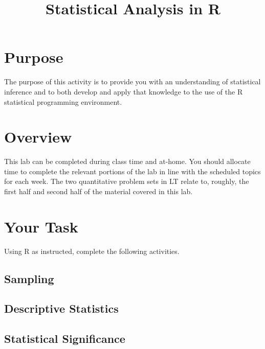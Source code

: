\documentclass[a4paper,12pt]{article}
\title{Statistical Analysis in R}
\author{}
\date{}
\begin{document}
\maketitle

\section{Purpose}

The purpose of this activity is to provide you with an understanding of statistical inference and to both develop and apply that knowledge to the use of the R statistical programming environment.

\section{Overview}

This lab can be completed during class time and at-home. You should allocate time to complete the relevant portions of the lab in line with the scheduled topics for each week. The two quantitative problem sets in LT relate to, roughly, the first half and second half of the material covered in this lab.

\section{Your Task}

Using R as instructed, complete the following activities.

\subsection{Sampling}

\begin{enumerate*}
\item 
\end{enumerate*}

\subsection{Descriptive Statistics}

\begin{enumerate*}
\item 
\end{enumerate*}

\subsection{Statistical Significance}
\end{document}

